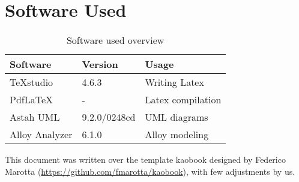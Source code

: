 \chapter{Software Used}
	\begin{center}
		\begin{table}[H]
			\begin{tabular}{ | m{3cm} | m{3cm} | m{3cm} | } 
					\hline
					\textbf {Software} & \textbf{Version} & \textbf{Usage} \\
					\hline
					TeXstudio & 4.6.3 & Writing Latex \\
					\hline
					PdfLaTeX & - & Latex compilation \\
					\hline
					Astah UML & 9.2.0/0248cd & UML diagrams \\
					\hline
					Alloy Analyzer & 6.1.0 & Alloy modeling \\
					\hline
				\end{tabular}
			\caption{Software used overview}
		\end{table}
		\end{center}
	
		This document was written over the template kaobook designed by Federico Marotta (\url{https://github.com/fmarotta/kaobook}), with few adjustments by us.
